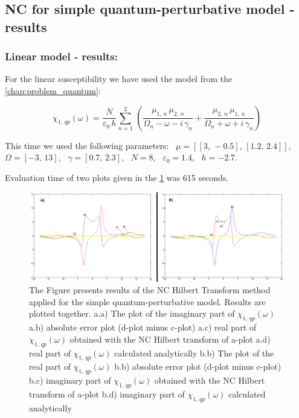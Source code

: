 \documentclass[12pt,twoside,a4paper]{article}
\numberwithin{equation}{subsection}
\numberwithin{figure}{subsection}
\begin{document}
\subsection{NC for simple quantum-perturbative model - results} \label{chap:nc_quantum}

\subsubsection*{Linear model - results:}

For the linear susceptibility we have used the model from the \ref{chap:problem_quantum}: 

\begin{equation} \label{eq:nclin_chipp}
  {\chi_{1, \,qp}}(\omega ) = \frac {N}{\varepsilon_0\,h} \sum_{n=1}^{2}\,(\frac {{\mu_{1, \,n}}\,{ \mu_{2, \,n}}}{{\Omega_{n}}
  - \omega  - i\,{\gamma_{n}}} + \frac {{\mu_{2, \,n}}\,{\mu_{1, \,n}}}{{\Omega_{n}} + \omega + i\,{\gamma_{n}}})
\end{equation}

This time we used the following parameters: \,
$\mu = [[3, \, - 0.5], \,[1.2, \,2.4]]$, \, 
$\Omega = [ - 3, \,13]$, \,
$\gamma = [0.7, \,2.3]$, \,
$N = 8$, \,
$\varepsilon_{0} = 1.4$, \,
$h = - 2.7$. 

Evaluation time of two plots given in the \ref{fig:nc_qp1} was 615 seconds.

\begin{figure}
  \includegraphics[width=150mm]{img/nc_qp1.png}
  \caption{ The Figure presents results of the NC Hilbert Transform method applied for the simple quantum-perturbative
  model. Results are plotted together. 
    a.a) The plot of the imaginary part of ${\chi_{1, \, qp}}(\omega )$
    a.b) absolute error plot (d-plot minus c-plot) 
    a.c) real part of ${\chi_{1, \, qp}}(\omega )$ obtained with the NC Hilbert transform of a-plot 
    a.d) real part of ${\chi_{1, \, qp}}(\omega )$ calculated analytically 
    b.b) The plot of the real part of ${\chi_{1, \, qp}}(\omega )$ 
    b.b) absolute error plot (d-plot minus c-plot) 
    b.c) imaginary part of ${\chi_{1, \, qp}}(\omega )$ obtained with the NC Hilbert transform of a-plot 
    b.d) imaginary part of ${\chi_{1, \, qp}}(\omega )$ calculated analytically  
    \label{fig:nc_qp1}
  }
\end{figure}
\end{document}
